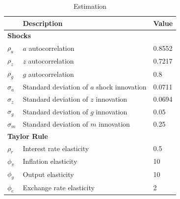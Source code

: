 \documentclass[12pt]{article}
\begin{document}
\begin{table}[h!]
\centering
\begin{tabular}{lll}
\hline\hline
& Description & Value \\\hline
\multicolumn{3}{l}{\bf Shocks}     \\                                                              
$\rho_a$      & $a$ autocorrelation    & 0.8552            \\
$\rho_z$       & $z$ autocorrelation     & 0.7217   	    \\
$\rho_g$     & $g$ autocorrelation & 0.8 \\
$\sigma_a$     & Standard deviation of $a$ shock innovation        & 0.0711   \\
$\sigma_z$     & Standard deviation of $z$ innovation   & 0.0694      \\
$\sigma_g$     &  Standard deviation of $g$  innovation & 0.05 \\
$\sigma_m$     & Standard deviation of $m$ innovation   & 0.25              \\
\multicolumn{3}{l}{\bf Taylor Rule}     \\ 
$\rho_r$     & Interest rate elasticity    & 0.5      	 \\
$\phi_{\pi}$    & Inflation elasticity       & 10       	\\
$\phi_y$       & Output elasticity           & 10     	\\
$\phi_e$       & Exchange rate elasticity          & 2      	\\\hline
\end{tabular}
\caption{Estimation}
\end{table}

\clearpage
\end{document}

